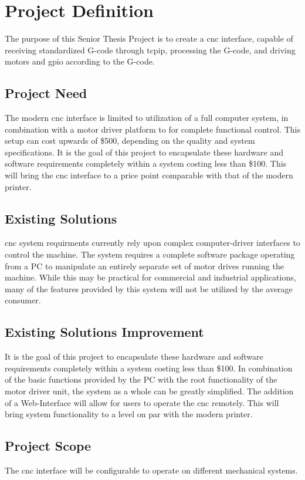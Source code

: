 \chapter{Project Definition}
The purpose of this Senior Thesis Project is to create a \gls{cnc} interface, capable of receiving standardized G-code through \gls{tcpip}, processing the G-code, and driving motors and \gls{gpio} according to the G-code. 

\section{Project Need}
The modern \gls{cnc} interface is limited to utilization of a full computer system, in combination with a motor driver platform to for complete functional control.
This setup can cost upwards of \$500, depending on the quality and system specifications.
It is the goal of this project to encapsulate these hardware and software requirements completely within a system costing less than \$100.
This will bring the \gls{cnc} interface to a price point comparable with tbat of the modern printer. 

\section{Existing Solutions}
\gls{cnc} system requirments currently rely upon complex computer-driver interfaces to control the machine.
The system requires a complete software package operating from a PC to manipulate an entirely separate set of motor drives running the machine.
While this may be practical for commercial and industrial applications, many of the features provided by this system will not be utilized by the average consumer.

\section{Existing Solutions Improvement}
It is the goal of this project to encapsulate these hardware and software requirements completely within a system costing less than \$100.
In combination of the basic functions provided by the PC with the root functionality of the motor driver unit, the system as a whole can be greatly simplified.
The addition of a Web-Interface will allow for users to operate the \gls{cnc} remotely.
This will bring system functionality to a level on par with the modern printer.

\section{Project Scope}
The \gls{cnc} interface will be configurable to operate on different mechanical systems. 

